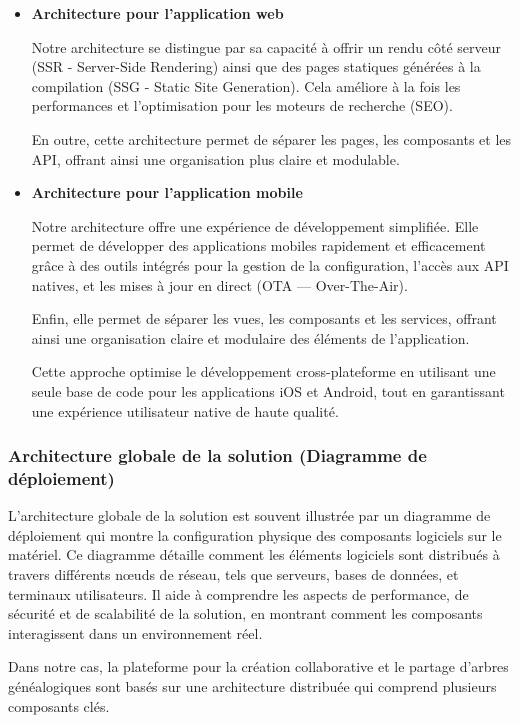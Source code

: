\begin{itemize}
  \item \textbf{Architecture pour l'application web }

    Notre architecture se distingue par sa capacité à offrir un rendu côté
    serveur (SSR - Server-Side Rendering) ainsi que des pages statiques générées
    à la compilation (SSG - Static Site Generation). Cela améliore à la fois
    les performances et l’optimisation pour les moteurs de recherche (SEO).

    En outre, cette architecture permet de séparer les pages, les composants et
    les API, offrant ainsi une organisation plus claire et modulable.

  \item \textbf{Architecture pour l'application mobile}

    Notre architecture offre une expérience de développement simplifiée. Elle
    permet de développer des applications mobiles rapidement et efficacement grâce
    à des outils intégrés pour la gestion de la configuration, l’accès aux API
    natives, et les mises à jour en direct (OTA — Over-The-Air).

    Enfin, elle permet de séparer les vues, les composants et les services, offrant
    ainsi une organisation claire et modulaire des éléments de l’application.

    Cette approche optimise le développement cross-plateforme en utilisant une seule
    base de code pour les applications iOS et Android, tout en garantissant une
    expérience utilisateur native de haute qualité.
\end{itemize}



\subsubsection{Architecture globale de la solution (Diagramme de déploiement)}
L’architecture globale de la solution est souvent illustrée par un diagramme de
déploiement qui montre la configuration physique des composants logiciels sur
le matériel. Ce diagramme détaille comment les éléments logiciels sont
distribués à travers différents nœuds de réseau, tels que serveurs, bases de
données, et terminaux utilisateurs. Il aide à comprendre les aspects de
performance, de sécurité et de scalabilité de la solution, en montrant comment
les composants interagissent dans un environnement réel.

Dans notre cas, la plateforme pour la création collaborative et le partage
d’arbres généalogiques sont basés sur une architecture distribuée qui
comprend plusieurs composants clés.

